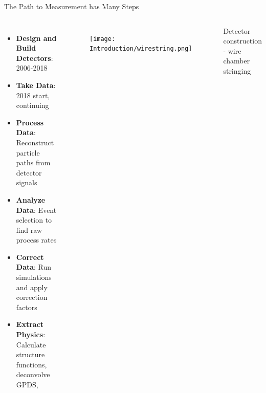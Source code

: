 \documentclass[aspectratio=169]{beamer}
\newcommand*{\myfont}{\fontfamily{lmtt}\selectfont}
\begin{document}
\begin{frame}{The Path to Measurement has Many Steps}
        \begin{columns}[t, onlytextwidth]
            
            \begin{itemize}
                \item \textbf{Design and Build Detectors}: 2006-2018
                \item \textbf{Take Data}: 2018 start, continuing
                \item \textbf{Process Data}: Reconstruct particle paths from detector signals 
                \item \textbf{Analyze Data}: Event selection to find raw process rates
                \item \textbf{Correct Data}: Run simulations and apply correction factors
                \item \textbf{Extract Physics}: Calculate structure functions, deconvolve GPDS, 
            \end{itemize}
                    \begin{figure}
                        \centering
                        \texttt{[image: Introduction/wirestring.png]}
                        
                         
                    \end{figure} 
    \centering
                        Detector construction - wire chamber stringing\\
                         {\myfont{\tiny[V. Burkert et al., NIMA, 959, 163419 (2020)] }}
                 
        \end{columns}
        

\end{frame}
\end{document}
